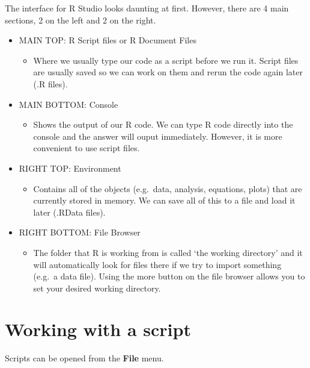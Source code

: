 \documentclass[
]{book}
\providecommand{\tightlist}{%
  \setlength{\itemsep}{0pt}\setlength{\parskip}{0pt}}
\begin{document}
The interface for R Studio looks daunting at first. However, there are 4 main sections, 2 on the left and 2 on the right.

\begin{itemize}
\tightlist
\item
  MAIN TOP: R Script files or R Document Files

  \begin{itemize}
  \tightlist
  \item
    Where we usually type our code as a script before we run it. Script files are usually saved so we can work on them and rerun the code again later (.R files).
  \end{itemize}
\item
  MAIN BOTTOM: Console

  \begin{itemize}
  \tightlist
  \item
    Shows the output of our R code. We can type R code directly into the console and the answer will ouput immediately. However, it is more convenient to use script files.
  \end{itemize}
\item
  RIGHT TOP: Environment

  \begin{itemize}
  \tightlist
  \item
    Contains all of the objects (e.g.~data, analysis, equations, plots) that are currently stored in memory. We can save all of this to a file and load it later (.RData files).
  \end{itemize}
\item
  RIGHT BOTTOM: File Browser

  \begin{itemize}
  \tightlist
  \item
    The folder that R is working from is called `the working directory' and it will automatically look for files there if we try to import something (e.g.~a data file). Using the more button on the file browser allows you to set your desired working directory.
  \end{itemize}
\end{itemize}

\hypertarget{working-with-a-script}{%
\section{Working with a script}\label{working-with-a-script}}

Scripts can be opened from the \textbf{File} menu.
\end{document}
